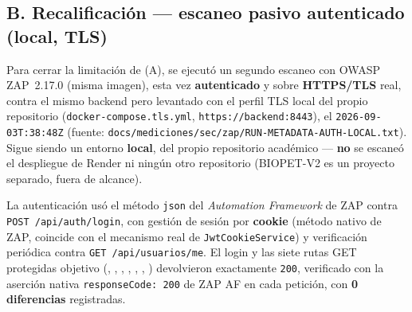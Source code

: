 \subsection{B. Recalificaci\'on --- escaneo pasivo autenticado (local, TLS)}
\label{sec:zap-authenticated-local}

Para cerrar la limitaci\'on de (A), se ejecut\'o un segundo escaneo con
OWASP ZAP~2.17.0 (misma imagen), esta vez \textbf{autenticado} y sobre
\textbf{HTTPS/TLS} real, contra el mismo backend pero levantado con el
perfil TLS local del propio repositorio
(\texttt{docker-compose.tls.yml}, \texttt{https://\allowbreak backend:8443}), el
\texttt{2026-09-03T:38:48Z} (fuente:
\texttt{docs/mediciones/sec/zap/RUN-METADATA-AUTH-LOCAL.txt}). Sigue
siendo un entorno \textbf{local}, del propio repositorio acad\'emico ---
\textbf{no} se escane\'o el despliegue de Render ni ning\'un otro
repositorio (BIOPET-V2 es un proyecto separado, fuera de alcance).

La autenticaci\'on us\'o el m\'etodo \texttt{json} del \emph{Automation
Framework} de ZAP contra \texttt{POST~/api/auth/login}, con gesti\'on de
sesi\'on por \textbf{cookie} (m\'etodo nativo de ZAP, coincide con el
mecanismo real de \texttt{JwtCookieService}) y verificaci\'on peri\'odica
contra \texttt{GET~/api/usuarios/me}. El login y las siete rutas GET
protegidas objetivo (, ,
, ,
, , )
devolvieron exactamente \texttt{200}, verificado con la aserci\'on nativa
\texttt{responseCode: 200} de ZAP AF en cada petici\'on, con \textbf{0
diferencias} registradas.

